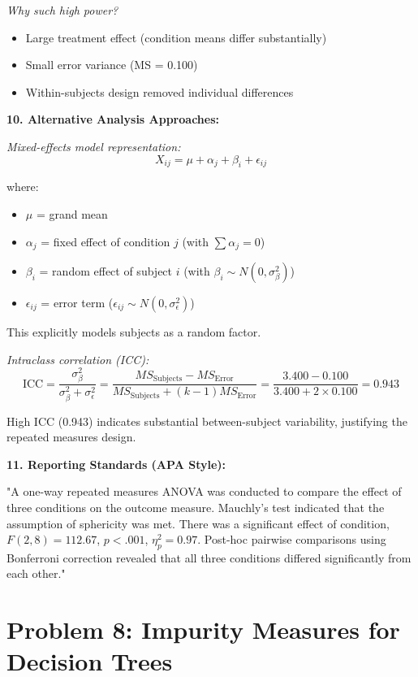 \documentclass[12pt]{article}
\begin{document}
\begin{explanation}
\textit{Why such high power?}
\begin{itemize}
\item Large treatment effect (condition means differ substantially)
\item Small error variance (MS = 0.100)
\item Within-subjects design removed individual differences
\end{itemize}

\textbf{10. Alternative Analysis Approaches:}

\textit{Mixed-effects model representation:}
\[
X_{ij} = \mu + \alpha_j + \beta_i + \epsilon_{ij}
\]

where:
\begin{itemize}
\item $\mu$ = grand mean
\item $\alpha_j$ = fixed effect of condition $j$ (with $\sum \alpha_j = 0$)
\item $\beta_i$ = random effect of subject $i$ (with $\beta_i \sim N(0, \sigma_\beta^2)$)
\item $\epsilon_{ij}$ = error term ($\epsilon_{ij} \sim N(0, \sigma_\epsilon^2)$)
\end{itemize}

This explicitly models subjects as a random factor.

\textit{Intraclass correlation (ICC):}
\[
\text{ICC} = \frac{\sigma_\beta^2}{\sigma_\beta^2 + \sigma_\epsilon^2} = \frac{MS_{\text{Subjects}} - MS_{\text{Error}}}{MS_{\text{Subjects}} + (k-1) MS_{\text{Error}}} = \frac{3.400 - 0.100}{3.400 + 2 \times 0.100} = 0.943
\]

High ICC (0.943) indicates substantial between-subject variability, justifying the repeated measures design.

\textbf{11. Reporting Standards (APA Style):}

"A one-way repeated measures ANOVA was conducted to compare the effect of three conditions on the outcome measure. Mauchly's test indicated that the assumption of sphericity was met. There was a significant effect of condition, $F(2, 8) = 112.67$, $p < .001$, $\eta_p^2 = 0.97$. Post-hoc pairwise comparisons using Bonferroni correction revealed that all three conditions differed significantly from each other."

\end{explanation}

\newpage

\section{Problem 8: Impurity Measures for Decision Trees}
\end{document}
